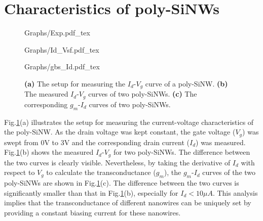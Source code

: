 \documentclass{article}
\begin{document}
\section{Characteristics of poly-SiNWs}
\begin{figure}[!htb]
    \begin{minipage}[!htb]{0.4\linewidth}
        \centering
        \def\svgwidth{3cm}
        \fontsize{6}{15}\selectfont
         {Graphs/Exp.pdf_tex}
        \fontsize{10}{10}\selectfont
    \end{minipage}
    \begin{minipage}[!htb]{0.6\linewidth}
        \begin{minipage}[!htb]{0.97\linewidth}
            \centering
            \def\svgwidth{4.3cm}
            \fontsize{6}{15}\selectfont
             {Graphs/Id_Vsf.pdf_tex}
        \end{minipage}
        \vfill
        \begin{minipage}[!htb]{1\linewidth}
            \centering
            \def\svgwidth{3.8cm}
            \fontsize{6}{15}\selectfont
             {Graphs/gbs_Id.pdf_tex}
        \end{minipage}
    \end{minipage}
    \caption{\textbf{(a)} The setup for measuring the $I_d$-$V_g$ curve of a poly-SiNW.
    \textbf{(b)} The measured $I_{d}$-$V_{g}$ curves of two poly-SiNWs.
    \textbf{(c)} The corresponding $g_m$-$I_{d}$ curves of two poly-SiNWs.}
    \label{fig:idvg}
\end{figure}
Fig.\ref{fig:idvg}(a) illustrates the setup for measuring the current-voltage characteristics of the poly-SiNW.
As the drain voltage was kept constant,
the gate voltage ($V_g$) was swept from 0V to 3V and the corresponding drain current ($I_{d}$) was measured.
Fig.\ref{fig:idvg}(b) shows the measured $I_d$-$V_g$ for two poly-SiNWs.
The difference between the two curves is clearly visible.
Nevertheless, by taking the derivative of $I_d$ with respect to $V_g$ to calculate the transconductance ($g_m$),
the $g_m$-$I_d$ curves of the two poly-SiNWs are shown in Fig.\ref{fig:idvg}(c).
The difference between the two curves is significantly smaller than that in Fig.\ref{fig:idvg}(b),
especially for $I_d < 10\mu A$.
This analysis implies that the transconductance of different nanowires can be uniquely set by
providing a constant biasing current for these nanowires.
\end{document}
